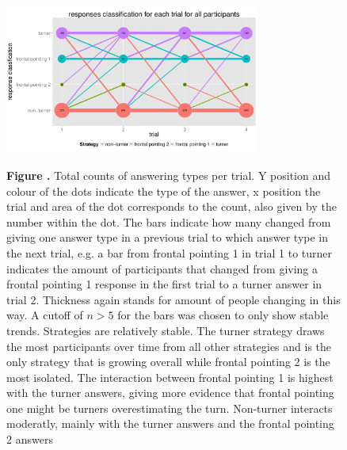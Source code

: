 \documentclass{frontiersSCNS} %
\begin{document}
\begin{figure}[h!]
\begin{center}
    \includegraphics[width=0.75\textwidth]{figures/stratGraphAll.pdf}
\end{center}
\textbf{\label{fig:03} Figure .}{  Total counts of answering types per trial. Y position and colour of the dots indicate the type of the answer, x position the trial and area of the dot corresponds to the count, also given by the number within the dot. The bars indicate how many changed from giving one answer type in a previous trial to which answer type in the next trial, e.g. a bar from frontal pointing 1 in trial 1 to turner indicates the amount of participants that changed from giving a frontal pointing 1 response in the first trial to a turner answer in trial 2. Thickness again stands for amount of people changing in this way. A cutoff of $n>5$ for the bars was chosen to only show stable trends.
Strategies are relatively stable. The turner strategy draws the most participants over time from all other strategies and is the only strategy that is growing overall while frontal pointing 2 is the most isolated. The interaction between frontal pointing 1 is highest with the turner answers, giving more evidence that frontal pointing one might be turners overestimating the turn. Non-turner interacts moderatly, mainly with the turner answers and the frontal pointing 2 answers}
   \label{fig:stratGraphAll}
\end{figure}
\end{document}
